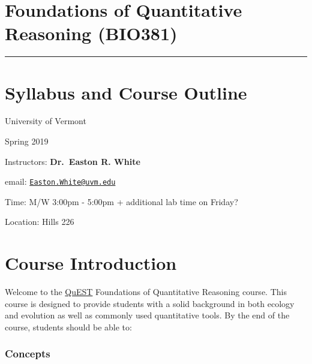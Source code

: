 \documentclass[12pt,]{article}
\title{}
\author{}
\date{}
\begin{document}
\section{Foundations of Quantitative Reasoning
(BIO381)}\label{foundations-of-quantitative-reasoning-bio381}

\begin{center}\rule{0.5\linewidth}{\linethickness}\end{center}

\section{Syllabus and Course Outline}\label{syllabus-and-course-outline}

University of Vermont

Spring 2019

Instructors: \textbf{Dr.~Easton R. White}

email:
\href{mailto:Easton.White@uvm.edu}{\nolinkurl{Easton.White@uvm.edu}}

Time: M/W 3:00pm - 5:00pm + additional lab time on Friday?

Location: Hills 226

\section{Course Introduction}\label{course-introduction}

Welcome to the \href{https://www.uvm.edu/quest}{QuEST} Foundations of
Quantitative Reasoning course. This course is designed to provide
students with a solid background in both ecology and evolution as well
as commonly used quantitative tools. By the end of the course, students
should be able to:

\subsubsection{Concepts}\label{concepts}
\end{document}
